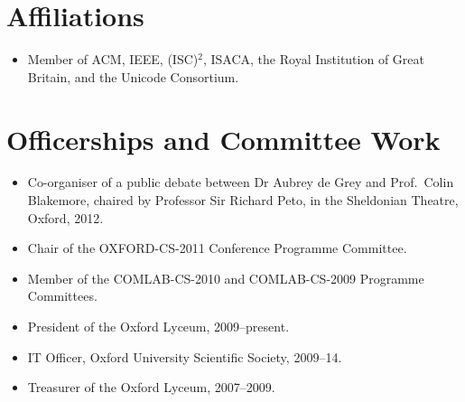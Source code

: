 \documentclass[12pt,twoside,letterpaper]{article}
\begin{document}



\section*{Affiliations}
\vspace{-2mm}
\begin{itemize}
	\item Member of ACM, IEEE, (ISC)$^2$, ISACA, the Royal Institution
		of Great Britain, and the Unicode Consortium.
\end{itemize}

\vspace{-8mm}
\section*{Officerships and Committee Work}
\vspace{-2mm}
\begin{itemize}
	\item Co-organiser of a public debate between Dr Aubrey de Grey
		and Prof.\ Colin Blakemore, chaired by Professor Sir Richard
		Peto, in the Sheldonian Theatre, Oxford, 2012.
	\item Chair of the OXFORD-CS-2011 Conference Programme Committee.
	\item Member of the COMLAB-CS-2010 and COMLAB-CS-2009 Programme
		Committees.
	\item President of the Oxford Lyceum, 2009--present.
	\item IT Officer, Oxford University Scientific Society, 2009--14.
	\item Treasurer of the Oxford Lyceum, 2007--2009.
\end{itemize}


\vspace{-8mm}
\end{document}
